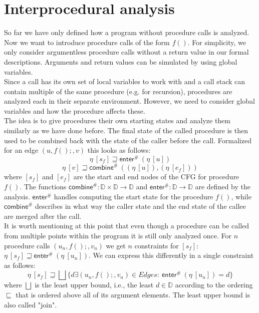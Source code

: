   \section{Interprocedural analysis}
    So far we have only defined how a program without procedure calls is analyzed. Now we want to introduce procedure calls of the form $f()$. For simplicity, we only consider argumentless procedure calls without a return value in our formal descriptions. Arguments and return values can be simulated by using global variables.\\
    Since a call has its own set of local variables to work with and a call stack can contain multiple of the same procedure (e.g. for recursion), procedures are analyzed each in their separate environment. However, we need to consider global variables and how the procedure affects these.\\
    The idea is to give procedures their own starting states and analyze them similarly as we have done before. The final state of the called procedure is then used to be combined back with the state of the caller before the call. Formalized for an edge $(u, f();, v)$ this looks as follows:
    \[\eta\ [s_f] \sqsupseteq \textsf{enter}^{\#}\ (\eta\ [u]) \]
    \[\eta\ [v] \sqsupseteq  \textsf{combine}^{\#}\ ((\eta\ [u]), (\eta\ [e_f])) \]
    where $[s_f]$ and $[e_f]$ are the start and end nodes of the CFG for procedure $f()$. The functions $\textsf{combine}^{\#}: \mathbb{D} \times \mathbb{D} \rightarrow \mathbb{D}$ and $\textsf{enter}^{\#}: \mathbb{D} \rightarrow \mathbb{D}$ are defined by the analysis. $\textsf{enter}^{\#}$ handles computing the start state for the procedure $f()$, while $\textsf{combine}^{\#}$ describes in what way the caller state and the end state of the callee are merged after the call.\\
    It is worth mentioning at this point that even though a procedure can be called from multiple points within the program it is still only analyzed once. For $n$ procedure calls $(u_n, f();, v_n)$ we get $n$ constraints for $[s_f]$: $\eta\ [s_f] \sqsupseteq \textsf{enter}^{\#}\ (\eta\ [u_n])$. We can express this differently in a single constraint as follows:
    \[\eta\ [s_f] \sqsupseteq \bigsqcup \{ d \exists (u_n, f();, v_n) \in Edges:\ \textsf{enter}^{\#}\ (\eta\ [u_n]) = d \}\]
    where $\bigsqcup$ is the least upper bound, i.e., the least $d \in \mathbb{D}$ according to the ordering $\sqsubseteq$ that is ordered above all of its argument elements. The least upper bound is also called "join".\\

